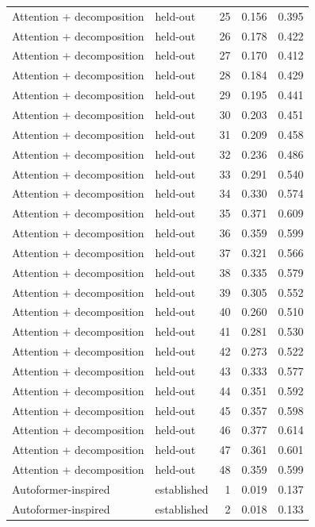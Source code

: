\begin{tabular}{llrrr}
Attention + decomposition & held-out & 25 & 0.156 & 0.395 \\
Attention + decomposition & held-out & 26 & 0.178 & 0.422 \\
Attention + decomposition & held-out & 27 & 0.170 & 0.412 \\
Attention + decomposition & held-out & 28 & 0.184 & 0.429 \\
Attention + decomposition & held-out & 29 & 0.195 & 0.441 \\
Attention + decomposition & held-out & 30 & 0.203 & 0.451 \\
Attention + decomposition & held-out & 31 & 0.209 & 0.458 \\
Attention + decomposition & held-out & 32 & 0.236 & 0.486 \\
Attention + decomposition & held-out & 33 & 0.291 & 0.540 \\
Attention + decomposition & held-out & 34 & 0.330 & 0.574 \\
Attention + decomposition & held-out & 35 & 0.371 & 0.609 \\
Attention + decomposition & held-out & 36 & 0.359 & 0.599 \\
Attention + decomposition & held-out & 37 & 0.321 & 0.566 \\
Attention + decomposition & held-out & 38 & 0.335 & 0.579 \\
Attention + decomposition & held-out & 39 & 0.305 & 0.552 \\
Attention + decomposition & held-out & 40 & 0.260 & 0.510 \\
Attention + decomposition & held-out & 41 & 0.281 & 0.530 \\
Attention + decomposition & held-out & 42 & 0.273 & 0.522 \\
Attention + decomposition & held-out & 43 & 0.333 & 0.577 \\
Attention + decomposition & held-out & 44 & 0.351 & 0.592 \\
Attention + decomposition & held-out & 45 & 0.357 & 0.598 \\
Attention + decomposition & held-out & 46 & 0.377 & 0.614 \\
Attention + decomposition & held-out & 47 & 0.361 & 0.601 \\
Attention + decomposition & held-out & 48 & 0.359 & 0.599 \\
Autoformer-inspired & established & 1 & 0.019 & 0.137 \\
Autoformer-inspired & established & 2 & 0.018 & 0.133 \\

\end{tabular}
